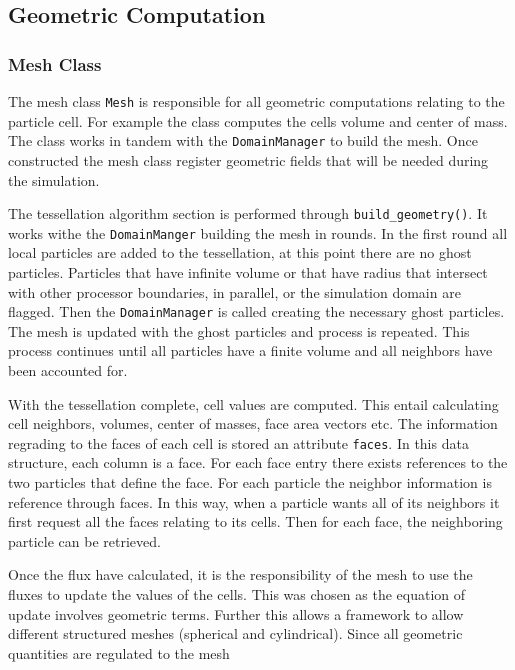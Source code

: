 \subsection{Geometric Computation}
\subsubsection{Mesh Class}
The mesh class \lstinline{Mesh} is responsible for all geometric computations relating
to the particle cell. For example the class computes the cells volume and center of mass.
The class works in tandem with the \lstinline{DomainManager} to build the mesh.
Once constructed the mesh class register geometric fields that will be needed during
the simulation.

The tessellation algorithm section is performed through \lstinline{build_geometry()}.
It works withe the \lstinline{DomainManger} building the mesh in rounds. In the first
round all local particles are added to the tessellation, at this point there are no
ghost particles. Particles that have infinite volume or that have radius that intersect
with other processor boundaries, in parallel, or the simulation domain are flagged. Then the 
\lstinline{DomainManager} is called creating the necessary ghost particles. The mesh is
updated with the ghost particles and process is repeated. This process continues until
all particles have a finite volume and all neighbors have been accounted for.

With the tessellation complete, cell values are computed. This entail calculating
cell neighbors, volumes, center of masses, face area vectors etc. The information
regrading to the faces of each cell is stored an attribute \lstinline{faces}. In this
data structure, each column is a face. For each face entry there exists references to
the two particles that define the face. For each particle the neighbor information
is reference through faces. In this way, when a particle wants all of its neighbors
it first request all the faces relating to its cells. Then for each face, the neighboring
particle can be retrieved.

Once the flux have calculated, it is the responsibility of the mesh to use the fluxes
to update the values of the cells. This was chosen as the equation of update involves
geometric terms. Further this allows a framework to allow different structured meshes
(spherical and cylindrical). Since all geometric quantities are regulated to the mesh

